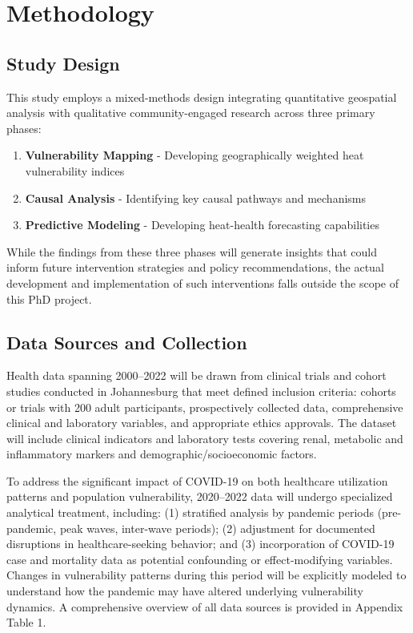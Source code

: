 \section{Methodology}

\subsection{Study Design}
This study employs a mixed-methods design integrating quantitative geospatial analysis with qualitative community-engaged research across three primary phases:
\begin{enumerate}
    \item \textbf{Vulnerability Mapping} - Developing geographically weighted heat vulnerability indices
    \item \textbf{Causal Analysis} - Identifying key causal pathways and mechanisms
    \item \textbf{Predictive Modeling} - Developing heat-health forecasting capabilities
\end{enumerate}

While the findings from these three phases will generate insights that could inform future intervention strategies and policy recommendations, the actual development and implementation of such interventions falls outside the scope of this PhD project.

\subsection{Data Sources and Collection}
Health data spanning 2000--2022 will be drawn from clinical trials and cohort studies conducted in Johannesburg that meet defined inclusion criteria: cohorts or trials with 200 adult participants, prospectively collected data, comprehensive clinical and laboratory variables, and appropriate ethics approvals. The dataset will include clinical indicators and laboratory tests covering renal, metabolic and inflammatory markers and demographic/socioeconomic factors. 

To address the significant impact of COVID-19 on both healthcare utilization patterns and population vulnerability, 2020--2022 data will undergo specialized analytical treatment, including: (1) stratified analysis by pandemic periods (pre-pandemic, peak waves, inter-wave periods); (2) adjustment for documented disruptions in healthcare-seeking behavior; and (3) incorporation of COVID-19 case and mortality data as potential confounding or effect-modifying variables. Changes in vulnerability patterns during this period will be explicitly modeled to understand how the pandemic may have altered underlying vulnerability dynamics. A comprehensive overview of all data sources is provided in Appendix Table 1.

